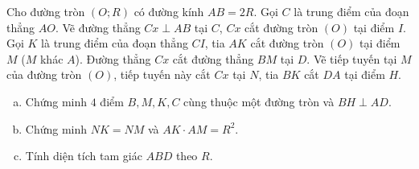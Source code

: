 \begin{bt}%
Cho đường tròn $(O; R)$ có đường kính $AB = 2R$. Gọi $C$ là trung điểm của đoạn thẳng $AO$. Vẽ đường thẳng $Cx \perp AB$ tại $C$, $Cx$ cắt đường tròn $(O)$ tại điểm $I$. Gọi $K$ là trung điểm của đoạn thẳng $CI$, tia $AK$ cắt đường tròn $(O)$ tại điểm $M$ ($M$ khác $A$). Đường thẳng $Cx$ cắt đường thẳng $BM$ tại $D$. Vẽ tiếp tuyến tại $M$ của đường tròn $(O)$, tiếp tuyến này cắt $Cx$ tại $N$, tia $BK$ cắt $DA$ tại điểm $H$.
\begin{enumerate}[a)]
	\item Chứng minh $4$ điểm $B, M, K, C$ cùng thuộc một đường tròn và $BH \perp AD$.
	\item Chứng minh $NK = NM$ và $AK \cdot AM = R^2$.
	\item Tính diện tích tam giác $ABD$ theo $R$.
\end{enumerate}
\end{bt}
